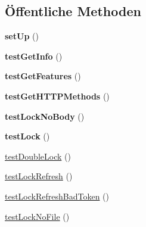 \subsection*{Öffentliche Methoden}
\begin{DoxyCompactItemize}
\item 
\mbox{\label{class_sabre_1_1_d_a_v_1_1_locks_1_1_plugin_test_a6020b876fb2cd1abc65425725d435b5a}} 
{\bfseries set\+Up} ()
\item 
\mbox{\label{class_sabre_1_1_d_a_v_1_1_locks_1_1_plugin_test_af6e5bbdd7f27665b38ced47b061ba530}} 
{\bfseries test\+Get\+Info} ()
\item 
\mbox{\label{class_sabre_1_1_d_a_v_1_1_locks_1_1_plugin_test_a41d3bab5642fb83b335163056ec9513b}} 
{\bfseries test\+Get\+Features} ()
\item 
\mbox{\label{class_sabre_1_1_d_a_v_1_1_locks_1_1_plugin_test_aff3f1ae4d2ec8ca1dddaebcff2368c63}} 
{\bfseries test\+Get\+H\+T\+T\+P\+Methods} ()
\item 
\mbox{\label{class_sabre_1_1_d_a_v_1_1_locks_1_1_plugin_test_a359390521b6444d11559dd4194cb3f99}} 
{\bfseries test\+Lock\+No\+Body} ()
\item 
\mbox{\label{class_sabre_1_1_d_a_v_1_1_locks_1_1_plugin_test_a0e8e7332d132eb1606913ab226c75189}} 
{\bfseries test\+Lock} ()
\item 
\mbox{\hyperlink{class_sabre_1_1_d_a_v_1_1_locks_1_1_plugin_test_aa5744280482467772405929bc02eab1a}{test\+Double\+Lock}} ()
\item 
\mbox{\hyperlink{class_sabre_1_1_d_a_v_1_1_locks_1_1_plugin_test_aa2f5f4f3d711de3c4f23627590ec161e}{test\+Lock\+Refresh}} ()
\item 
\mbox{\hyperlink{class_sabre_1_1_d_a_v_1_1_locks_1_1_plugin_test_ad1cdee23e3734e7000f8b01a58356330}{test\+Lock\+Refresh\+Bad\+Token}} ()
\item 
\mbox{\hyperlink{class_sabre_1_1_d_a_v_1_1_locks_1_1_plugin_test_a8938f6aac057192bbe9b016ce03e63cb}{test\+Lock\+No\+File}} ()
\item 

\end{DoxyCompactItemize}
